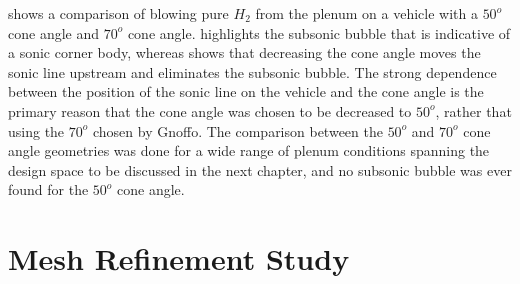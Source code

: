  shows a comparison of blowing pure $H_2$ from the
plenum on a vehicle with a $50^o$ cone angle and $70^o$ cone angle.
 highlights the subsonic bubble that is indicative of a
sonic corner body, whereas  shows that decreasing the cone
angle moves the sonic line upstream and eliminates the subsonic bubble.  The
strong dependence between the position of the sonic line on the vehicle and the
cone angle is the primary reason that the cone angle was chosen to be decreased
to $50^o$, rather that using the $70^o$ chosen by
Gnoffo\cite{gnoffo2016tapping}.  The comparison between the $50^o$ and
$70^o$ cone angle geometries was done for a wide range of plenum conditions
spanning the design space to be discussed in the next chapter, and no subsonic
bubble was ever found for the $50^o$ cone angle.

\section{Mesh Refinement Study}
\label{sec:mesh-refinement-study}

